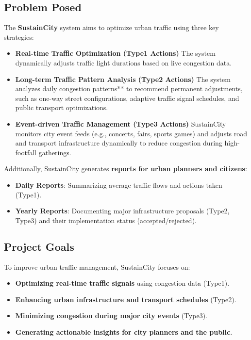 \documentclass[a4paper,12pt]{article}
\begin{document}
\subsection{Problem Posed}
The \textbf{SustainCity} system aims to optimize urban traffic using three key strategies:
\begin{itemize}
    \item \textbf{Real-time Traffic Optimization (Type1 Actions)} 
    The system dynamically adjusts traffic light durations based on live congestion data.  
    \item \textbf{Long-term Traffic Pattern Analysis (Type2 Actions)}  
    The system analyzes daily congestion patterns** to recommend permanent adjustments, such as one-way street configurations, adaptive traffic signal schedules, and public transport optimizations.
    \item \textbf{Event-driven Traffic Management (Type3 Actions)}
    SustainCity monitors city event feeds (e.g., concerts, fairs, sports games) and adjusts road and transport infrastructure dynamically to reduce congestion during high-footfall gatherings.
\end{itemize}

\noindent Additionally, SustainCity generates \textbf{reports for urban planners and citizens}:
\begin{itemize}
    \item \textbf{Daily Reports}: Summarizing average traffic flows and actions taken (Type1).
    \item \textbf{Yearly Reports}: Documenting major infrastructure proposals (Type2, Type3) and their implementation status (accepted/rejected).
\end{itemize}

\subsection{Project Goals}
To improve urban traffic management, SustainCity focuses on:
\begin{itemize}
    \item \textbf{Optimizing real-time traffic signals} using congestion data (Type1).
    \item \textbf{Enhancing urban infrastructure and transport schedules} (Type2).
    \item \textbf{Minimizing congestion during major city events} (Type3).
    \item \textbf{Generating actionable insights for city planners and the public}.
\end{itemize}
\end{document}
